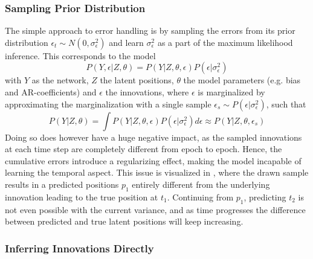     \subsubsection{Sampling Prior Distribution}
    
        The simple approach to error handling is by sampling the errors from its prior distribution $\epsilon_t\sim N(0,\sigma_\epsilon^2)$ and learn $\sigma_\epsilon^2$ as a part of the maximum likelihood inference.
        This corresponds to the model
        \begin{equation}
            P(Y,\epsilon|Z,\theta) = P(Y|Z,\theta,\epsilon)P(\epsilon|\sigma_\epsilon^2)
        \end{equation}
        with $Y$ as the network, $Z$ the latent positions, $\theta$ the model parameters (e.g. bias and AR-coefficients) and $\epsilon$ the innovations, where $\epsilon$ is marginalized by approximating the marginalization with a single sample $\epsilon_s \sim P(\epsilon|\sigma_\epsilon^2)$, such that
        \begin{equation}
            P(Y|Z,\theta) = \int P(Y|Z,\theta,\epsilon) P(\epsilon|\sigma_\epsilon^2) d\epsilon \approx P(Y|Z,\theta,\epsilon_s)
        \end{equation}
        Doing so does however have a huge negative impact, as the sampled innovations at each time step are completely different from epoch to epoch. Hence, the cumulative errors introduce a regularizing effect, making the model incapable of learning the temporal aspect. This issue is visualized in , where the drawn sample results in a predicted positions $p_1$ entirely different from the underlying innovation leading to the true position at $t_1$. 
        Continuing from $p_1$, predicting $t_2$ is not even possible with the current variance, and as time progresses the difference between predicted and true latent positions will keep increasing.
    
    \subsubsection{Inferring Innovations Directly}

